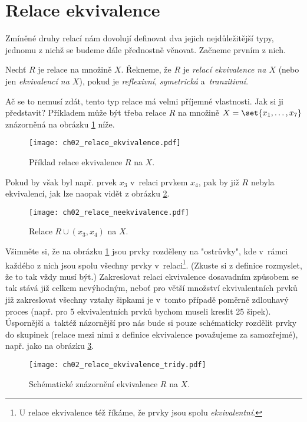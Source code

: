\section{Relace ekvivalence}\label{sec:relace_ekvivalence}
Zmíněné druhy relací nám dovolují definovat dva jejich nejdůležitější typy, jednomu z nichž se budeme dále přednostně věnovat. Začneme prvním z nich.
\begin{definition}\label{def:relace_ekvivalence}
    Nechť $R$ je relace na množině $X$. Řekneme, že $R$ je \emph{relací ekvivalence na $X$} (nebo jen \emph{ekvivalencí na $X$}), pokud je \emph{reflexivní}, \emph{symetrická} a~\emph{tranzitivní}.
\end{definition}
Ač se to nemusí zdát, tento typ relace má velmi příjemné vlastnosti. Jak si ji představit? Příkladem může být třeba relace $R$ na množině $X=\set{x_1,\dots,x_7}$ znázorněná na obrázku \ref{fig:priklad_relace_ekvivalence} níže.
\begin{figure}[H]
    \centering
    \texttt{[image: ch02\_relace\_ekvivalence.pdf]}
    \caption{Příklad relace ekvivalence $R$ na $X$.}
    \label{fig:priklad_relace_ekvivalence}
\end{figure}
Pokud by však byl např. prvek $x_3$ v~relaci prvkem $x_4$, pak by již $R$ nebyla ekvivalencí, jak lze naopak vidět z obrázku \ref{fig:priklad_relace_neekvivalence}.
\begin{figure}[H]
    \centering
    \texttt{[image: ch02\_relace\_neekvivalence.pdf]}
    \caption{Relace $R \cup (x_3,x_4)$ na $X$.}
    \label{fig:priklad_relace_neekvivalence}
\end{figure}
Všimněte si, že na obrázku \ref{fig:priklad_relace_ekvivalence} jsou prvky rozděleny na "ostrůvky", kde v~rámci každého z nich jsou spolu všechny prvky v~relaci\footnote{U relace ekvivalence též říkáme, že prvky jsou spolu \emph{ekvivalentní}.}. (Zkuste si z definice rozmyslet, že to tak vždy musí být.) Zakreslovat relaci ekvivalence dosavadním způsobem se tak stává již celkem nevýhodným, neboť pro větší množství ekvivalentních prvků již zakreslovat všechny vztahy šipkami je v~tomto případě poměrně zdlouhavý proces (např. pro 5 ekvivalentních prvků bychom museli kreslit 25 šipek). Úspornější a~taktéž názornější pro nás bude si pouze schématicky rozdělit prvky do skupinek (relace mezi nimi z definice ekvivalence považujeme za samozřejmé), např. jako na obrázku \ref{fig:relace_ekvivalence_tridy}.
\begin{figure}[H]
    \centering
    \texttt{[image: ch02\_relace\_ekvivalence\_tridy.pdf]}
    \caption{Schématické znázornění ekvivalence $R$ na $X$.}
    \label{fig:relace_ekvivalence_tridy}
\end{figure}
